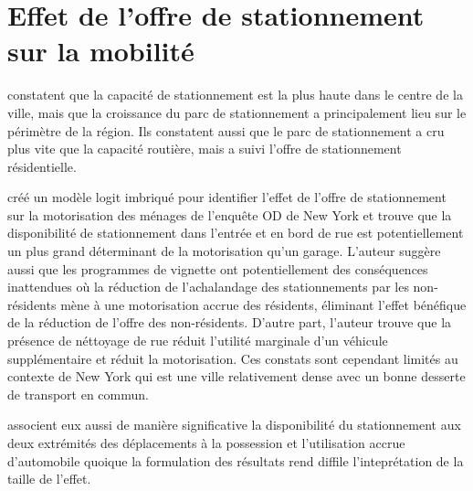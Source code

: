 \section{Effet de l'offre de stationnement sur la mobilité}

\textcite{Chester:ParkingInfrastructure:2015} constatent que la capacité de stationnement est la plus haute dans le centre de la ville, mais que la croissance du parc de stationnement a principalement lieu sur le périmètre de la région.  Ils constatent aussi que le parc de stationnement a cru plus vite que la capacité routière, mais a suivi l'offre de stationnement résidentielle.\par
\textcite{Guo:DoesResidential:2013} créé un modèle logit imbriqué pour identifier l'effet de l'offre de stationnement sur la motorisation des ménages de l'enquête OD de New York et trouve que la disponibilité de stationnement dans l'entrée et en bord de rue est potentiellement un plus grand déterminant de la motorisation qu'un garage. L'auteur suggère aussi que les programmes de vignette ont potentiellement des conséquences inattendues où la réduction de l'achalandage des stationnements par les non-résidents mène à une motorisation accrue des résidents, éliminant l'effet bénéfique de la réduction de l'offre des non-résidents. D'autre part, l'auteur trouve que la présence de néttoyage de rue réduit l'utilité marginale d'un véhicule supplémentaire et réduit la motorisation. Ces constats sont cependant limités au contexte de New York qui est une ville relativement dense avec un bonne desserte de transport en commun.\par
\textcite{Yin:BuiltEnvironment:2018} associent eux aussi de manière significative la disponibilité du stationnement aux deux extrémités des déplacements à la possession et l'utilisation accrue d'automobile quoique la formulation des résultats rend diffile l'inteprétation de la taille de l'effet.\par
